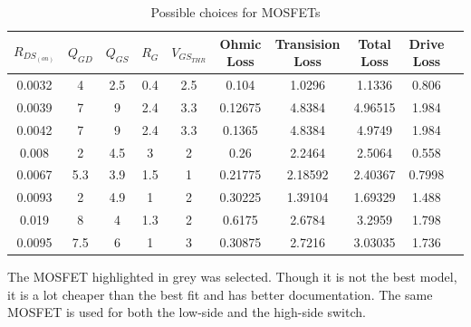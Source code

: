 \begin{table}[th!]
    \begin{center}
        \caption{Possible choices for MOSFETs}
        \label{tab:circuit:buck:mosfet}
        \begin{tabular}{cccccccccc}
            \toprule
            $R_{DS_{(on)}}$ & $Q_{GD}$ & $Q_{GS}$ & $R_G$ & $V_{GS_{THR}}$ & Ohmic Loss & Transision Loss & Total Loss & Drive Loss \\
            \midrule
            0.0032          & 4        & 2.5      & 0.4   & 2.5            & 0.104      & 1.0296          & 1.1336     & 0.806 \\
            0.0039          & 7        & 9        & 2.4   & 3.3            & 0.12675    & 4.8384          & 4.96515    & 1.984 \\
            0.0042          & 7        & 9        & 2.4   & 3.3            & 0.1365     & 4.8384          & 4.9749     & 1.984 \\
            0.008           & 2        & 4.5      & 3     & 2              & 0.26       & 2.2464          & 2.5064     & 0.558 \\
            0.0067          & 5.3      & 3.9      & 1.5   & 1              & 0.21775    & 2.18592         & 2.40367    & 0.7998 \\
            \rowcolor{lightgray}
            0.0093          & 2        & 4.9      & 1     & 2              & 0.30225    & 1.39104         & 1.69329    & 1.488 \\
            0.019           & 8        & 4        & 1.3   & 2              & 0.6175     & 2.6784          & 3.2959     & 1.798 \\
            0.0095          & 7.5      & 6        & 1     & 3              & 0.30875    & 2.7216          & 3.03035    & 1.736 \\
            \bottomrule
        \end{tabular}
    \end{center}
\end{table}


The MOSFET highlighted in grey was selected.  Though it is not the best model,
it is a lot  cheaper than the best fit and  has better documentation. The same
MOSFET is used for both the low-side and the high-side switch.
